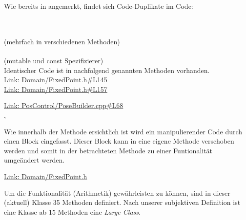 







Wie bereits in  angemerkt, findet sich Code-Duplikate im Code:

\zB\\
\\
 (mehrfach in verschiedenen Methoden)\\
\zB\\
 (mutable und const Spezifizierer)\\
Identischer Code ist in nachfolgend genannten Methoden vorhanden.\\
\href{https://github.com/MobMonRob/ROSLabDrohne/blob/73f3400f4866b27200a37be5d3a80fa8394b2c48/Code/Domain/include/Domain/FixedPoint.h\#L145}{Link: Domain/FixedPoint.h\#L145}\\
\href{https://github.com/MobMonRob/ROSLabDrohne/blob/73f3400f4866b27200a37be5d3a80fa8394b2c48/Code/Domain/include/Domain/FixedPoint.h\#L157}{Link: Domain/FixedPoint.h\#L157}


\href{https://github.com/MobMonRob/ROSLabDrohne/blob/73f3400f4866b27200a37be5d3a80fa8394b2c48/Code/PosControl/src/PoseBuilder.cpp\#L68}{Link: PosControl/PoseBuilder.cpp\#L68}
\\
, 

Wie innerhalb der Methode ersichtlich ist wird ein manipulierender Code durch einen Block eingefasst. Dieser Block kann in eine eigene Methode verschoben werden und somit in der betrachteten Methode zu einer Funtionalität umgeändert werden.




\href{https://github.com/MobMonRob/ROSLabDrohne/blob/73f3400f4866b27200a37be5d3a80fa8394b2c48/Code/Domain/include/Domain/FixedPoint.h}{Link: Domain/FixedPoint.h}
\\

Um die Funktionalität (Arithmetik) gewährleisten zu können, sind in dieser (aktuell) Klasse 35 Methoden definiert.
Nach unserer subjektiven Definition ist eine Klasse ab 15 Methoden eine \textit{Large Class}.


